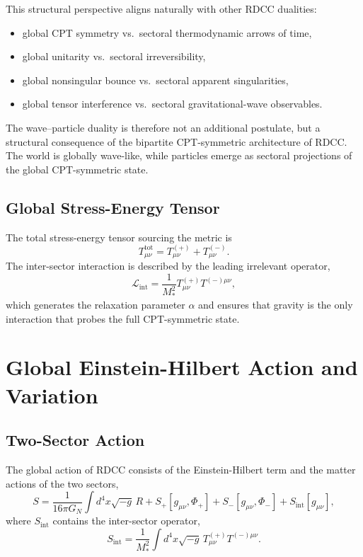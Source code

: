 \documentclass[11pt,a4paper]{article}
\begin{document}
This structural perspective aligns naturally with other RDCC dualities:
\begin{itemize}
    \item global CPT symmetry vs.\ sectoral thermodynamic arrows of time,
    \item global unitarity vs.\ sectoral irreversibility,
    \item global nonsingular bounce vs.\ sectoral apparent singularities,
    \item global tensor interference vs.\ sectoral gravitational-wave observables.
\end{itemize}

The wave–particle duality is therefore not an additional postulate, but a structural consequence
of the bipartite CPT-symmetric architecture of RDCC. The world is globally wave-like, while
particles emerge as sectoral projections of the global CPT-symmetric state.



\subsection{Global Stress-Energy Tensor}

The total stress-energy tensor sourcing the metric is
\begin{equation}
T_{\mu\nu}^{\mathrm{tot}} = T_{\mu\nu}^{(+)} + T_{\mu\nu}^{(-)}.
\end{equation}
The inter-sector interaction is described by the leading irrelevant operator,
\begin{equation}
\mathcal{L}_{\mathrm{int}} = \frac{1}{M_*^2} T^{(+)}_{\mu\nu} T^{(-)\mu\nu},
\end{equation}
which generates the relaxation parameter $\alpha$ and ensures that gravity is the only interaction that probes the full CPT-symmetric state.

\section{Global Einstein-Hilbert Action and Variation}

\subsection{Two-Sector Action}

The global action of RDCC consists of the Einstein-Hilbert term and the matter actions of the two sectors,
\begin{equation}
S = \frac{1}{16\pi G_N} \int d^4x \sqrt{-g} \, R 
+ S_+[g_{\mu\nu}, \Phi_+] 
+ S_-[g_{\mu\nu}, \Phi_-]
+ S_{\mathrm{int}}[g_{\mu\nu}],
\end{equation}
where $S_{\mathrm{int}}$ contains the inter-sector operator,
\begin{equation}
S_{\mathrm{int}} = \frac{1}{M_*^2} \int d^4x \sqrt{-g} \, 
T^{(+)}_{\mu\nu} T^{(-)\mu\nu}.
\end{equation}
\end{document}
